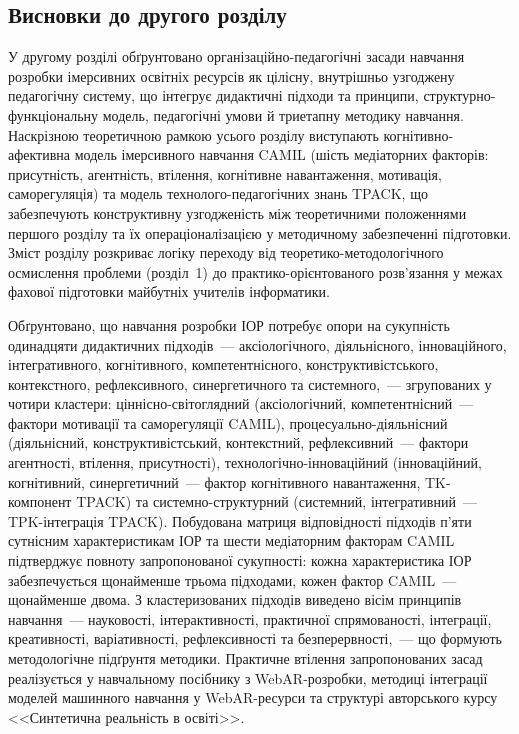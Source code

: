 \subsection*{Висновки до другого розділу}

У другому розділі обґрунтовано організаційно-педагогічні засади навчання розробки імерсивних освітніх ресурсів як цілісну, внутрішньо узгоджену педагогічну систему, що інтегрує дидактичні підходи та принципи, структурно-функціональну модель, педагогічні умови й триетапну методику навчання. Наскрізною теоретичною рамкою усього розділу виступають когнітивно-афективна модель імерсивного навчання CAMIL (шість медіаторних факторів: присутність, агентність, втілення, когнітивне навантаження, мотивація, саморегуляція) та модель технолого-педагогічних знань TPACK, що забезпечують конструктивну узгодженість між теоретичними положеннями першого розділу та їх операціоналізацією у методичному забезпеченні підготовки. Зміст розділу розкриває логіку переходу від теоретико-методологічного осмислення проблеми (розділ~1) до практико-орієнтованого розв'язання у межах фахової підготовки майбутніх учителів інформатики.

Обґрунтовано, що навчання розробки ІОР потребує опори на сукупність одинадцяти дидактичних підходів~--- аксіологічного, діяльнісного, інноваційного, інтегративного, когнітивного, компетентнісного, конструктивістського, контекстного, рефлексивного, синергетичного та системного,~--- згрупованих у чотири кластери: ціннісно-світоглядний (аксіологічний, компетентнісний~--- фактори мотивації та саморегуляції CAMIL), процесуально-діяльнісний (діяльнісний, конструктивістський, контекстний, рефлексивний~--- фактори агентності, втілення, присутності), технологічно-інноваційний (інноваційний, когнітивний, синергетичний~--- фактор когнітивного навантаження, TK-компонент TPACK) та системно-структурний (системний, інтегративний~--- TPK-інтеграція TPACK). Побудована матриця відповідності підходів п'яти сутнісним характеристикам ІОР та шести медіаторним факторам CAMIL підтверджує повноту запропонованої сукупності: кожна характеристика ІОР забезпечується щонайменше трьома підходами, кожен фактор CAMIL~--- щонайменше двома. З кластеризованих підходів виведено вісім принципів навчання~--- науковості, інтерактивності, практичної спрямованості, інтеграції, креативності, варіативності, рефлексивності та безперервності,~--- що формують методологічне підґрунтя методики. Практичне втілення запропонованих засад реалізується у навчальному посібнику з WebAR-розробки, методиці інтеграції моделей машинного навчання у WebAR-ресурси та структурі авторського курсу <<Синтетична реальність в освіті>>.

